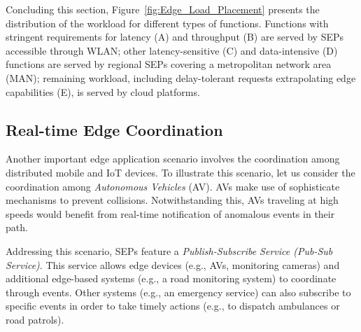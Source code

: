 Concluding this section, Figure~\ref{fig:Edge_Load_Placement} presents the distribution of the workload for different types of functions. Functions with stringent requirements for latency (A) and throughput (B) are served by SEPs accessible through WLAN; other latency-sensitive (C) and data-intensive (D) functions are served by regional SEPs covering a metropolitan network area (MAN); remaining workload, including delay-tolerant requests extrapolating edge capabilities (E), is served by cloud platforms. 




\subsection{Real-time Edge Coordination}\label{sec:SEP_RTEC}


Another important edge application scenario involves the coordination among distributed mobile and IoT devices. %
To illustrate this scenario, let us consider the coordination among \textit{Autonomous Vehicles} (AV). %
AVs make use of sophisticate mechanisms to prevent collisions. Notwithstanding this, AVs traveling at high speeds would benefit from real-time notification of anomalous events in their path. 

Addressing this scenario, SEPs feature a \textit{Publish-Subscribe Service (Pub-Sub Service)}. This service allows edge devices (e.g., AVs, monitoring cameras) and additional edge-based systems (e.g., a road monitoring system) to coordinate through events.
Other systems (e.g., an emergency service) can also subscribe to specific events in order to take timely actions (e.g., to dispatch ambulances or road patrols).

